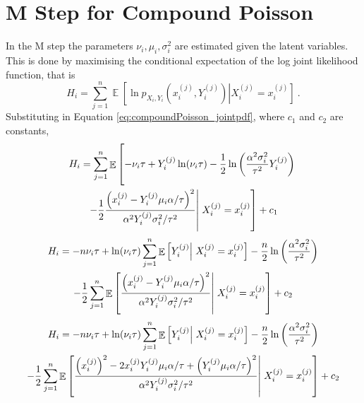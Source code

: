 \documentclass[12pt]{report}
\DeclareMathOperator{\expectation}{\mathbb{E}}
\begin{document}
\section{M Step for Compound Poisson}\label{chapter:mStep_compoundPoisson}
In the M step the parameters $\nu_i,\mu_i,\sigma_i^2$ are estimated given the latent variables. This is done by maximising the conditional expectation of the log joint likelihood function, that is
\begin{equation*}
H_i=\sum_{j=1}^n\expectation\left[\ln p_{X_i,Y_i}\left(x_i^{(j)},Y_i^{(j)}\right)\right|\left.X_i^{(j)}=x_i^{(j)}\right] \ .
\end{equation*}
Substituting in Equation \eqref{eq:compoundPoisson_jointpdf}, where $c_1$ and $c_2$ are constants,
\begin{multline*}
H_i=\sum_{j=1}^n\expectation\left[
-\nu_i\tau+Y_i^{(j)}\ln(\nu_i\tau)-\frac{1}{2}\ln\left(\frac{\alpha^2\sigma_i^2}{\tau^2}Y_i^{(j)}\right)
\vphantom{-\frac{1}{2}\frac{\left(x_i^{(j)}-Y_i^{(j)}\mu_i\alpha/\tau\right)^2}{\alpha^2Y_i^{(j)}\sigma_i^2/\tau^2}}\right.
\\
\left.
-\frac{1}{2}\frac{\left(x_i^{(j)}-Y_i^{(j)}\mu_i\alpha/\tau\right)^2}{\alpha^2Y_i^{(j)}\sigma_i^2/\tau^2}\right|\left.X_i^{(j)}=x_i^{(j)}
\vphantom{-\frac{1}{2}\frac{\left(x_i^{(j)}-Y_i^{(j)}\mu_i\alpha/\tau\right)^2}{\alpha^2Y_i^{(j)}\sigma_i^2/\tau^2}}
\right] + c_1
\end{multline*}
\begin{multline*}
H_i= -n\nu_i\tau+\ln(\nu_i\tau)\sum_{j=1}^n\expectation\left[Y_i^{(j)}\right|\left.X_i^{(j)}=x_i^{(j)}\right]-\frac{n}{2}\ln\left(\frac{\alpha^2\sigma_i^2}{\tau^2}\right)
\\
-\frac{1}{2}\sum_{j=1}^n\expectation\left[\frac{\left(x_i^{(j)}-Y_i^{(j)}\mu_i\alpha/\tau\right)^2}{\alpha^2Y_i^{(j)}\sigma_i^2/\tau^2}\right|\left.X_i^{(j)}=x_i^{(j)}
\vphantom{-\frac{1}{2}\frac{\left(x_i^{(j)}-Y_i^{(j)}\mu_i\alpha/\tau\right)^2}{\alpha^2Y_i^{(j)}\sigma_i^2/\tau^2}}\right]
 + c_2
\end{multline*}
\begin{multline*}
H_i= -n\nu_i\tau+\ln(\nu_i\tau)\sum_{j=1}^n\expectation\left[Y_i^{(j)}\right|\left.X_i^{(j)}=x_i^{(j)}\right]-\frac{n}{2}\ln\left(\frac{\alpha^2\sigma_i^2}{\tau^2}\right)
\\
-\frac{1}{2}\sum_{j=1}^n\expectation\left[\frac{\left(x_i^{(j)}\right)^2-2x_i^{(j)}Y_i^{(j)}\mu_i\alpha/\tau+\left(Y_i^{(j)}\mu_i\alpha/\tau\right)^2}{\alpha^2Y_i^{(j)}\sigma_i^2/\tau^2}\right|\left.X_i^{(j)}=x_i^{(j)}
\vphantom{-\frac{1}{2}\frac{\left(x_i^{(j)}-Y_i^{(j)}\mu_i\alpha/\tau\right)^2}{\alpha^2Y_i^{(j)}\sigma_i^2/\tau^2}}\right]
 + c_2
\end{multline*}
\end{document}
